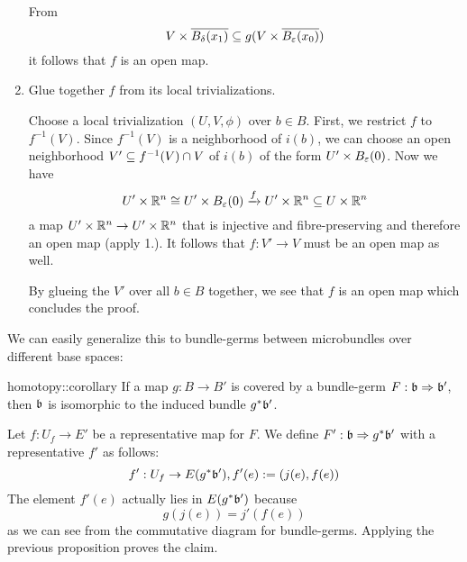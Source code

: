 \begin{myproof}
\begin{enumerate}
        From
        \[ V \times \clball[\delta][x_1] \sub g(V \times \clball[\varepsilon][x_0]) \]
        it follows that $f$ is an open map.

        \item Glue together $f$ from its local trivializations.

        Choose a local trivialization $(U, V, \phi)$ over $b \in B$.
        First, we restrict $f$ to $f^{-1}(V)$.
        Since $f^{-1}(V)$ is a neighborhood of $i(b)$, we can choose an open neighborhood $V' \subseteq{} f^{-1}(V) \cap V$ of $i(b)$ of the form $U' \times \ball[\varepsilon]$.
        Now we have
        \[ U' \times \R^n \cong U' \times \ball[\varepsilon] \xto{f} U' \times \R^n \sub U \times \R^n \]
        a map $U' \times \mathbb{R}^n \to U' \times \mathbb{R}^n$ that is injective and fibre-preserving and therefore an open map (apply 1.).
        It follows that $f: V' \to V$ must be an open map as well.

        By glueing the $V'$ over all $b \in B$ together, we see that $f$ is an open map which concludes the proof.
    \end{enumerate}
\end{myproof}

\begin{myparagraph}
    We can easily generalize this to bundle-germs between microbundles over different base spaces:
\end{myparagraph}

\begin{mycorollary}{homotopy::corollary}
    If a map $g: B \to B'$ is covered by a bundle-germ $F: \mathfrak{b} \Rightarrow{} \mathfrak{b}'$, then $\mathfrak{b}$ is isomorphic to the induced bundle $g^*\mathfrak{b}'$.
\end{mycorollary}
\begin{myproof}
    Let $f: U_f \to E'$ be a representative map for $F$.
    We define $F': \mathfrak{b} \Rightarrow{} g^*\mathfrak{b}'$ with a representative $f'$ as follows:
    \[ f': U_f \to E(g^*\mathfrak{b}'), f'(e) := (j(e), f(e)) \]
    The element $f'(e)$ actually lies in $E(g^*\mathfrak{b}')$ because
    \[ g(j(e)) = j'(f(e)) \]
    as we can see from the commutative diagram for bundle-germs.
    Applying the previous proposition proves the claim.
\end{myproof}